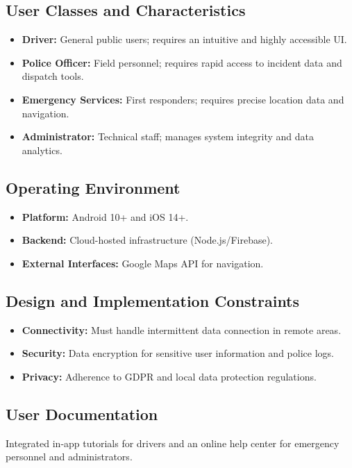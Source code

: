 \documentclass[11pt,a4paper]{article}
\begin{document}
\subsection{User Classes and Characteristics}
\begin{itemize}
    \item \textbf{Driver:} General public users; requires an intuitive and highly accessible UI.
    \item \textbf{Police Officer:} Field personnel; requires rapid access to incident data and dispatch tools.
    \item \textbf{Emergency Services:} First responders; requires precise location data and navigation.
    \item \textbf{Administrator:} Technical staff; manages system integrity and data analytics.
\end{itemize}

\subsection{Operating Environment}
\begin{itemize}
    \item \textbf{Platform:} Android 10+ and iOS 14+.
    \item \textbf{Backend:} Cloud-hosted infrastructure (Node.js/Firebase).
    \item \textbf{External Interfaces:} Google Maps API for navigation.
\end{itemize}

\subsection{Design and Implementation Constraints}
\begin{itemize}
    \item \textbf{Connectivity:} Must handle intermittent data connection in remote areas.
    \item \textbf{Security:} Data encryption for sensitive user information and police logs.
    \item \textbf{Privacy:} Adherence to GDPR and local data protection regulations.
\end{itemize}

\subsection{User Documentation}
Integrated in-app tutorials for drivers and an online help center for emergency personnel and administrators.
\end{document}

